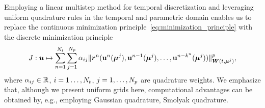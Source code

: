 \documentclass[3p,computermodern,10pt]{elsarticle}
\begin{document}
Employing a linear multistep method for temporal discretization and leveraging uniform quadrature rules in the temporal and parametric domain enables us to replace the continuous minimization principle~\eqref{eq:minimization_principle} with the discrete minimization principle 
 \begin{equation}\label{eq:minimization_principle}
J : \boldsymbol u \mapsto \sum_{n=1}^{N_t}  \sum_{j=1}^{N_p} \alpha_{ij} \| \boldsymbol{r}^n (\mathbf{u}^n(\boldsymbol \mu^j),\mathbf{u}^{n-1}(\boldsymbol \mu^j),\ldots,\mathbf{u}^{n-k^n}(\boldsymbol \mu^j)) \|_{\boldsymbol W(t,\boldsymbol \mu^j)}^p,
\end{equation}
where $\alpha_{ij} \in \mathbb{R}^{}$, $i=1\dots,N_t$, $j=1,\ldots,N_p$ are quadrature weights. We emphasize that, although we present uniform grids here, computational advantages can be obtained by, e.g., employing Gaussian quadrature, Smolyak quadrature.
 

\end{document}
